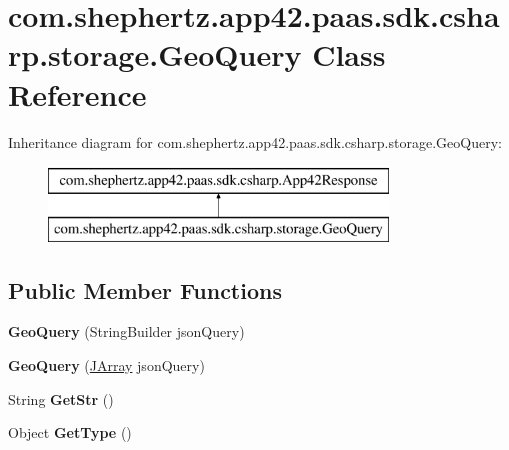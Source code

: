 \hypertarget{classcom_1_1shephertz_1_1app42_1_1paas_1_1sdk_1_1csharp_1_1storage_1_1_geo_query}{\section{com.\+shephertz.\+app42.\+paas.\+sdk.\+csharp.\+storage.\+Geo\+Query Class Reference}
\label{classcom_1_1shephertz_1_1app42_1_1paas_1_1sdk_1_1csharp_1_1storage_1_1_geo_query}
}
Inheritance diagram for com.\+shephertz.\+app42.\+paas.\+sdk.\+csharp.\+storage.\+Geo\+Query\+:\begin{figure}[H]
\begin{center}
\leavevmode
\includegraphics[height=2.000000cm]{classcom_1_1shephertz_1_1app42_1_1paas_1_1sdk_1_1csharp_1_1storage_1_1_geo_query}
\end{center}
\end{figure}
\subsection*{Public Member Functions}
\begin{DoxyCompactItemize}
\item 
\hypertarget{classcom_1_1shephertz_1_1app42_1_1paas_1_1sdk_1_1csharp_1_1storage_1_1_geo_query_ac0bdae6750ffe6367721ca26a483796b}{{\bfseries Geo\+Query} (String\+Builder json\+Query)}\label{classcom_1_1shephertz_1_1app42_1_1paas_1_1sdk_1_1csharp_1_1storage_1_1_geo_query_ac0bdae6750ffe6367721ca26a483796b}

\item 
\hypertarget{classcom_1_1shephertz_1_1app42_1_1paas_1_1sdk_1_1csharp_1_1storage_1_1_geo_query_afdd11ef24bec671aa7ebe58282dd3b6f}{{\bfseries Geo\+Query} (\hyperlink{class_simple_j_s_o_n_1_1_j_array}{J\+Array} json\+Query)}\label{classcom_1_1shephertz_1_1app42_1_1paas_1_1sdk_1_1csharp_1_1storage_1_1_geo_query_afdd11ef24bec671aa7ebe58282dd3b6f}

\item 
\hypertarget{classcom_1_1shephertz_1_1app42_1_1paas_1_1sdk_1_1csharp_1_1storage_1_1_geo_query_a5a1969376c517f7d11529b39f96fd89a}{String {\bfseries Get\+Str} ()}\label{classcom_1_1shephertz_1_1app42_1_1paas_1_1sdk_1_1csharp_1_1storage_1_1_geo_query_a5a1969376c517f7d11529b39f96fd89a}

\item 
\hypertarget{classcom_1_1shephertz_1_1app42_1_1paas_1_1sdk_1_1csharp_1_1storage_1_1_geo_query_ad2d9e6dc6b9c9d8f04723768ea6012f2}{Object {\bfseries Get\+Type} ()}\label{classcom_1_1shephertz_1_1app42_1_1paas_1_1sdk_1_1csharp_1_1storage_1_1_geo_query_ad2d9e6dc6b9c9d8f04723768ea6012f2}

\end{DoxyCompactItemize}
